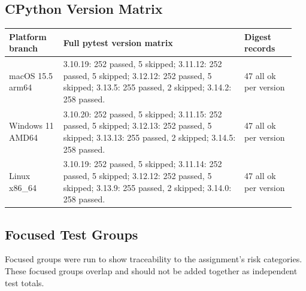 \documentclass[10pt,a4paper]{article}
\begin{document}
\subsection{CPython Version Matrix}

\begingroup
\small
\setlength{\tabcolsep}{5pt}
\renewcommand{\arraystretch}{1.12}

\begin{longtable}{@{}L{0.18\linewidth}L{0.60\linewidth}L{0.17\linewidth}@{}}
\toprule
\textbf{Platform branch} & \textbf{Full pytest version matrix} & \textbf{Digest records} \\
\midrule

macOS 15.5 arm64 &
3.10.19: 252 passed, 5 skipped; 3.11.12: 252 passed, 5 skipped; 3.12.12: 252 passed, 5 skipped; 3.13.5: 255 passed, 2 skipped; 3.14.2: 258 passed. &
47 all ok per version \\

Windows 11 AMD64 &
3.10.20: 252 passed, 5 skipped; 3.11.15: 252 passed, 5 skipped; 3.12.13: 252 passed, 5 skipped; 3.13.13: 255 passed, 2 skipped; 3.14.5: 258 passed. &
47 all ok per version \\

Linux x86\_64 &
3.10.19: 252 passed, 5 skipped; 3.11.14: 252 passed, 5 skipped; 3.12.12: 252 passed, 5 skipped; 3.13.9: 255 passed, 2 skipped; 3.14.0: 258 passed. &
47 all ok per version \\

\bottomrule
\end{longtable}
\endgroup

\subsection{Focused Test Groups}

Focused groups were run to show traceability to the assignment's risk categories. These focused groups overlap and should not be added together as independent test totals.

\begingroup
\small
\setlength{\tabcolsep}{5pt}
\renewcommand{\arraystretch}{1.12}
\end{document}
